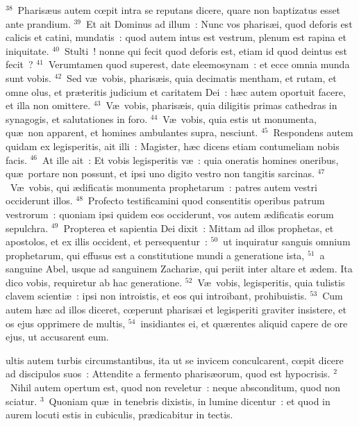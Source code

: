 ${}^{38}$~Pharis\ae us autem cœpit intra se reputans dicere, quare non baptizatus esset ante prandium.
${}^{39}$~Et ait Dominus ad illum~: Nunc vos pharis\ae i, quod deforis est calicis et catini, mundatis~: quod autem intus est vestrum, plenum est rapina et iniquitate.
${}^{40}$~Stulti~! nonne qui fecit quod deforis est, etiam id quod deintus est fecit~?
${}^{41}$~Verumtamen quod superest, date eleemosynam~: et ecce omnia munda sunt vobis.
${}^{42}$~Sed v\ae\ vobis, pharis\ae is, quia decimatis mentham, et rutam, et omne olus, et pr\ae teritis judicium et caritatem Dei~: h\ae c autem oportuit facere, et illa non omittere.
${}^{43}$~V\ae\ vobis, pharis\ae is, quia diligitis primas cathedras in synagogis, et salutationes in foro.
${}^{44}$~V\ae\ vobis, quia estis ut monumenta, qu\ae\ non apparent, et homines ambulantes supra, nesciunt.
${}^{45}$~Respondens autem quidam ex legisperitis, ait illi~: Magister, h\ae c dicens etiam contumeliam nobis facis.
${}^{46}$~At ille ait~: Et vobis legisperitis v\ae~: quia oneratis homines oneribus, qu\ae\ portare non possunt, et ipsi uno digito vestro non tangitis sarcinas.
${}^{47}$~V\ae\ vobis, qui \ae dificatis monumenta prophetarum~: patres autem vestri occiderunt illos.
${}^{48}$~Profecto testificamini quod consentitis operibus patrum vestrorum~: quoniam ipsi quidem eos occiderunt, vos autem \ae dificatis eorum sepulchra.
${}^{49}$~Propterea et sapientia Dei dixit~: Mittam ad illos prophetas, et apostolos, et ex illis occident, et persequentur~:
${}^{50}$~ut inquiratur sanguis omnium prophetarum, qui effusus est a constitutione mundi a generatione ista,
${}^{51}$~a sanguine Abel, usque ad sanguinem Zachari\ae , qui periit inter altare et \ae dem. Ita dico vobis, requiretur ab hac generatione.
${}^{52}$~V\ae\ vobis, legisperitis, quia tulistis clavem scienti\ae~: ipsi non introistis, et eos qui introibant, prohibuistis.
${}^{53}$~Cum autem h\ae c ad illos diceret, cœperunt pharis\ae i et legisperiti graviter insistere, et os ejus opprimere de multis,
${}^{54}$~insidiantes ei, et qu\ae rentes aliquid capere de ore ejus, ut accusarent eum.

\bchapter
{}ultis autem turbis circumstantibus, ita ut se invicem conculcarent, cœpit dicere ad discipulos suos~: Attendite a fermento pharis\ae orum, quod est hypocrisis.
${}^{2}$~Nihil autem opertum est, quod non reveletur~: neque absconditum, quod non sciatur.
${}^{3}$~Quoniam qu\ae\ in tenebris dixistis, in lumine dicentur~: et quod in aurem locuti estis in cubiculis, pr\ae dicabitur in tectis.


